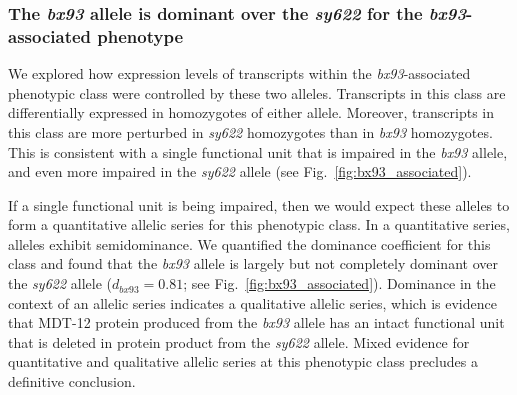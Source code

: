 \documentclass[10pt, twocolumn]{article}
\newcommand{\protein}[1]{\mbox{\uppercase{#1}}}
\begin{document}
\subsubsection*{The \emph{bx93} allele is dominant over the \emph{sy622} for the
                \emph{bx93}-associated phenotype}
We explored how expression levels of transcripts within the
\emph{bx93}-associated phenotypic class were controlled by these two alleles.
Transcripts in this class are differentially expressed in homozygotes of either
allele. Moreover, transcripts in this class are more perturbed in \emph{sy622}
homozygotes than in \emph{bx93} homozygotes. This is consistent with a single
functional unit that is impaired in the \emph{bx93} allele, and even more
impaired in the \emph{sy622} allele (see Fig.~\ref{fig:bx93_associated}).

If a single functional unit is being impaired, then we would expect these
alleles to form a quantitative allelic series for this phenotypic class. In a
quantitative series, alleles exhibit semidominance. We quantified the dominance
coefficient for this class and found that the \emph{bx93} allele is largely but
not completely dominant over the \emph{sy622} allele ($d_{bx93}=0.81$; see
Fig.~\ref{fig:bx93_associated}). Dominance in the context of an allelic series
indicates a qualitative allelic series, which is evidence that \protein{MDT-12}
protein produced from the \emph{bx93} allele has an intact functional unit that
is deleted in protein product from the \emph{sy622} allele. Mixed evidence for
quantitative and qualitative allelic series at this phenotypic class precludes a
definitive conclusion.
\end{document}
